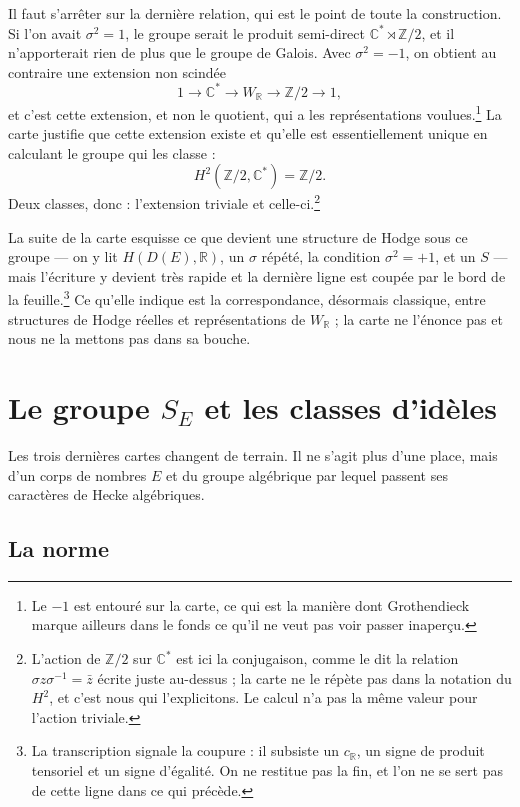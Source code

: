 \documentclass[11pt,a4paper]{article}
\begin{document}
Il faut s'arrêter sur la dernière relation, qui est le point de toute la
construction. Si l'on avait $\sigma^{2} = 1$, le groupe serait le produit
semi-direct $\mathbb{C}^{*} \rtimes \mathbb{Z}/2$, et il n'apporterait rien de
plus que le groupe de Galois. Avec $\sigma^{2} = -1$, on obtient au contraire
une extension non scindée
\[
1 \longrightarrow \mathbb{C}^{*} \longrightarrow W_{\mathbb{R}}
\longrightarrow \mathbb{Z}/2 \longrightarrow 1 ,
\]
et c'est cette extension, et non le quotient, qui a les représentations
voulues.\footnote{Le $-1$ est entouré sur la carte, ce qui est la manière dont
Grothendieck marque ailleurs dans le fonds ce qu'il ne veut pas voir passer
inaperçu.} La carte justifie que cette extension existe et qu'elle est
essentiellement unique en calculant le groupe qui les classe :
\[
H^{2}(\mathbb{Z}/2, \mathbb{C}^{*}) = \mathbb{Z}/2 .
\]
Deux classes, donc : l'extension triviale et celle-ci.\footnote{L'action de
$\mathbb{Z}/2$ sur $\mathbb{C}^{*}$ est ici la conjugaison, comme le dit la
relation $\sigma z\sigma^{-1} = \bar{z}$ écrite juste au-dessus ; la carte ne le
répète pas dans la notation du $H^{2}$, et c'est nous qui l'explicitons. Le
calcul n'a pas la même valeur pour l'action triviale.}

La suite de la carte esquisse ce que devient une structure de Hodge sous ce
groupe --- on y lit $H(D(E), \mathbb{R})$, un $\sigma$ répété, la condition
$\sigma^{2} = +1$, et un $S$ --- mais l'écriture y devient très rapide et la
dernière ligne est coupée par le bord de la feuille.\footnote{La transcription
signale la coupure : il subsiste un $c_{\mathbb{R}}$, un signe de produit
tensoriel et un signe d'égalité. On ne restitue pas la fin, et l'on ne se sert
pas de cette ligne dans ce qui précède.} Ce qu'elle indique est la
correspondance, désormais classique, entre structures de Hodge réelles et
représentations de $W_{\mathbb{R}}$ ; la carte ne l'énonce pas et nous ne la
mettons pas dans sa bouche.

\section*{Le groupe $S_{E}$ et les classes d'idèles}

Les trois dernières cartes changent de terrain. Il ne s'agit plus d'une place,
mais d'un corps de nombres $E$ et du groupe algébrique par lequel passent ses
caractères de Hecke algébriques.

\subsection*{La norme}
\end{document}
